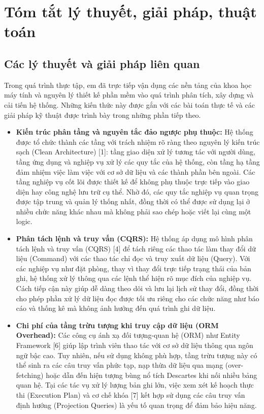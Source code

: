 \section{Tóm tắt lý thuyết, giải pháp, thuật toán}

\subsection{Các lý thuyết và giải pháp liên quan}

Trong quá trình thực tập, em đã trực tiếp vận dụng các nền tảng của khoa học máy tính và nguyên lý thiết kế phần mềm vào quá trình phân tích, xây dựng và cải tiến hệ thống. Những kiến thức này được gắn với các bài toán thực tế và các giải pháp kỹ thuật được trình bày trong những phần tiếp theo.

\begin{itemize}[leftmargin=1.2cm, itemsep=3pt, topsep=3pt]
\item \textbf{Kiến trúc phân tầng và nguyên tắc đảo ngược phụ thuộc:} Hệ thống được tổ chức thành các tầng với trách nhiệm rõ ràng theo nguyên lý kiến trúc sạch (Clean Architecture) [1]: tầng giao diện xử lý tương tác với người dùng, tầng ứng dụng và nghiệp vụ xử lý các quy tắc của hệ thống, còn tầng hạ tầng đảm nhiệm việc làm việc với cơ sở dữ liệu và các thành phần bên ngoài. Các tầng nghiệp vụ cốt lõi được thiết kế để không phụ thuộc trực tiếp vào giao diện hay công nghệ lưu trữ cụ thể. Nhờ đó, các quy tắc nghiệp vụ quan trọng được tập trung và quản lý thống nhất, đồng thời có thể được sử dụng lại ở nhiều chức năng khác nhau mà không phải sao chép hoặc viết lại cùng một logic.

\item \textbf{Phân tách lệnh và truy vấn (CQRS):} Hệ thống áp dụng mô hình phân tách lệnh và truy vấn (CQRS) [4] để tách riêng các thao tác làm thay đổi dữ liệu (Command) với các thao tác chỉ đọc và truy xuất dữ liệu (Query). Với các nghiệp vụ như đặt phòng, thay vì thay đổi trực tiếp trạng thái của bản ghi, hệ thống xử lý thông qua các lệnh thể hiện rõ mục đích của nghiệp vụ. Cách tiếp cận này giúp dễ dàng theo dõi và lưu lại lịch sử thay đổi, đồng thời cho phép phần xử lý dữ liệu đọc được tối ưu riêng cho các chức năng như báo cáo và thống kê mà không ảnh hưởng đến quá trình ghi dữ liệu.

\item \textbf{Chi phí của tầng trừu tượng khi truy cập dữ liệu (ORM Overhead):} Các công cụ ánh xạ đối tượng-quan hệ (ORM) như Entity Framework [6] giúp lập trình viên thao tác với cơ sở dữ liệu thông qua ngôn ngữ bậc cao. Tuy nhiên, nếu sử dụng không phù hợp, tầng trừu tượng này có thể sinh ra các câu truy vấn phức tạp, nạp thừa dữ liệu qua mạng (over-fetching) hoặc dẫn đến hiện tượng bùng nổ tích Descartes khi nối nhiều bảng quan hệ. Tại các tác vụ xử lý lượng bản ghi lớn, việc xem xét kế hoạch thực thi (Execution Plan) và cơ chế khóa [7] kết hợp sử dụng các câu truy vấn định hướng (Projection Queries) là yếu tố quan trọng để đảm bảo hiệu năng.


\end{itemize}
